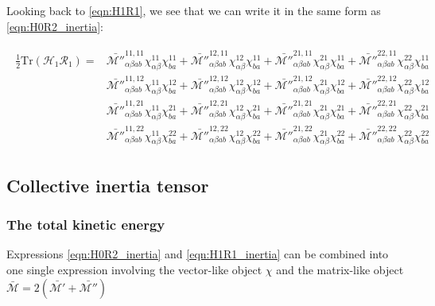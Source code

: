 Looking back to \eqref{eqn:H1R1}, we see that we can write it in the same form as \eqref{eqn:H0R2_inertia}:

\begin{tcolorbox}
	\begin{align}\label{eqn:H1R1_inertia}
	\begin{aligned}
	\frac{1}{2}\mathrm{Tr}\left(\mathcal{H}_1\mathcal{R}_1\right) = &
	\mathcal{\bar{M''}}^{11,11}_{\alpha\beta ab}\chi^{11}_{\alpha\beta}\chi^{11}_{ba} +
	\mathcal{\bar{M''}}^{12,11}_{\alpha\beta ab}\chi^{12}_{\alpha\beta}\chi^{11}_{ba} +
	\mathcal{\bar{M''}}^{21,11}_{\alpha\beta ab}\chi^{21}_{\alpha\beta}\chi^{11}_{ba} +
	\mathcal{\bar{M''}}^{22,11}_{\alpha\beta ab}\chi^{22}_{\alpha\beta}\chi^{11}_{ba} \\
	&
	\mathcal{\bar{M''}}^{11,12}_{\alpha\beta ab}\chi^{11}_{\alpha\beta}\chi^{12}_{ba} +
	\mathcal{\bar{M''}}^{12,12}_{\alpha\beta ab}\chi^{12}_{\alpha\beta}\chi^{12}_{ba} +
	\mathcal{\bar{M''}}^{21,12}_{\alpha\beta ab}\chi^{21}_{\alpha\beta}\chi^{12}_{ba} +
	\mathcal{\bar{M''}}^{22,12}_{\alpha\beta ab}\chi^{22}_{\alpha\beta}\chi^{12}_{ba} \\
	&
	\mathcal{\bar{M''}}^{11,21}_{\alpha\beta ab}\chi^{11}_{\alpha\beta}\chi^{21}_{ba} +
	\mathcal{\bar{M''}}^{12,21}_{\alpha\beta ab}\chi^{12}_{\alpha\beta}\chi^{21}_{ba} +
	\mathcal{\bar{M''}}^{21,21}_{\alpha\beta ab}\chi^{21}_{\alpha\beta}\chi^{21}_{ba} +
	\mathcal{\bar{M''}}^{22,21}_{\alpha\beta ab}\chi^{22}_{\alpha\beta}\chi^{21}_{ba} \\
	&
	\mathcal{\bar{M''}}^{11,22}_{\alpha\beta ab}\chi^{11}_{\alpha\beta}\chi^{22}_{ba} +
	\mathcal{\bar{M''}}^{12,22}_{\alpha\beta ab}\chi^{12}_{\alpha\beta}\chi^{22}_{ba} +
	\mathcal{\bar{M''}}^{21,22}_{\alpha\beta ab}\chi^{21}_{\alpha\beta}\chi^{22}_{ba} +
	\mathcal{\bar{M''}}^{22,22}_{\alpha\beta ab}\chi^{22}_{\alpha\beta}\chi^{22}_{ba}
	\end{aligned}
	\end{align}
\end{tcolorbox}


\subsection{Collective inertia tensor}

\subsubsection{The total kinetic energy}

Expressions \eqref{eqn:H0R2_inertia} and \eqref{eqn:H1R1_inertia} can be combined into one single expression involving the vector-like object $\chi$ and the matrix-like object $\mathcal{\bar{M}}=2(\mathcal{\bar{M'}+\bar{M''}})$


